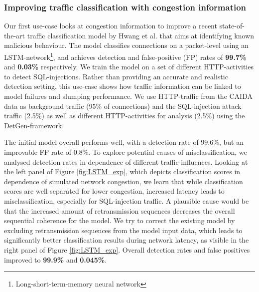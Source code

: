 \documentclass{article}
\begin{document}
\subsubsection{Improving traffic classification with congestion information}
Our first use-case looks at congestion information to improve a recent state-of-the-art  traffic classification model by Hwang et al. \cite{hwang2019lstm} that aims at identifying known malicious behaviour.
The model classifies connections on a packet-level using an LSTM-network\footnote{Long-short-term-memory neural network}, and achieves detection and false-positive (FP) rates of \textbf{99.7\%} and \textbf{0.03\%} respectively. We train the model on a set of different HTTP-activities to detect SQL-injections. Rather than providing an accurate and realistic detection setting, this use-case shows how traffic information can be linked to model failures and slumping performance.
We use HTTP-traffic from the CAIDA data as background traffic (95\% of connections) and the SQL-injection attack traffic (2.5\%) as well as different HTTP-activities for analysis (2.5\%) using the DetGen-framework.

The initial model overall performs well, with a detection rate of $99.6\%$, but an improvable FP-rate of $0.8\%$. To explore potential causes of misclassification, we analysed detection rates in dependence of different traffic influences. Looking at the left panel of Figure \ref{fig:LSTM_exp}, which depicts classification scores in dependence of simulated network congestion, we learn that while classification scores are well separated for lower congestion, increased latency leads to misclassification, especially for SQL-injection traffic. A plausible cause would be that the increased amount of retransmission sequences decreases the overall sequential coherence for the model. We try to correct the existing model by excluding retransmission sequences from the model input data, which leads to significantly better classification results during network latency, as visible in the right panel of Figure \ref{fig:LSTM_exp}. Overall detection rates and false positives improved to \textbf{99.9\%} and \textbf{0.045\%}.



\end{document}
